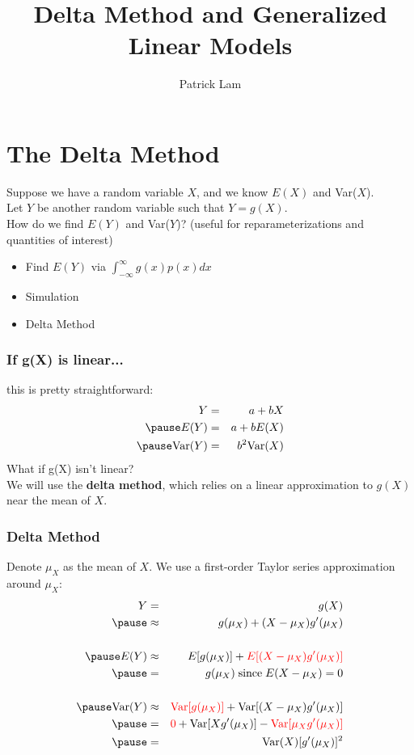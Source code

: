 \documentclass{beamer}
\author{Patrick Lam}
\title{Delta Method and Generalized Linear Models}
\date{}
\begin{document}
\newcommand{\red}{\textcolor{red}}
\newcommand{\blue}{\textcolor{blue}}
\newcommand{\purple}{\textcolor{purple}}
\newcommand{\brown}{\textcolor{brown}}

\frame{\titlepage}

\section{The Delta Method}

\begin{frame}
\pause
Suppose we have a random variable $X$, and we know $E(X)$ and Var($X$).\\
\pause
\bigskip
Let $Y$ be another random variable such that $Y = g(X)$. \\
\pause
\bigskip
How do we find $E(Y)$ and Var($Y$)? \pause (useful for
reparameterizations and quantities of interest) \\
\pause
\begin{itemize}
\item Find $E(Y)$ via $\int_{-\infty}^{\infty} g(x) p(x) dx$
\pause
\item Simulation
\pause
\item Delta Method
\end{itemize}
\end{frame}

\begin{frame}
\frametitle{If g(X) is linear...}
\pause
this is pretty straightforward:
\pause
\begin{eqnarray*}
Y &=& a + bX \\
\pause
E(Y) &=& a + b E(X) \\
\pause
\mathrm{Var}(Y) &=& b^2 \mathrm{Var}(X)
\end{eqnarray*}
\pause
What if g(X) isn't linear? \\
\bigskip
\pause
We will use the \textbf{delta method}, which relies on a linear approximation to $g(X)$ near the mean of $X$.
\end{frame}

\begin{frame}
\frametitle{Delta Method}
\pause
Denote $\mu_X$ as the mean of $X$. \pause We use a first-order
Taylor series approximation around $\mu_X$:
\pause
\begin{eqnarray*}
Y &=& g(X) \\
\pause
&\approx& g(\mu_X) + (X - \mu_X) g'(\mu_X) \\ \\
\pause 
E(Y) &\approx& E[g(\mu_X)] + \red{E[(X - \mu_X) g'(\mu_X)]} \\
\pause
&=& g(\mu_X) \; \mathrm{since \;}E(X-\mu_X) = 0 \\ \\
\pause
\mathrm{Var}(Y) &\approx& \red{\mathrm{Var}[g(\mu_X)]} + \mathrm{Var}[(X -
\mu_X) g'(\mu_X)] \\
\pause
&=& \red{0} + \mathrm{Var}[X g'(\mu_X)] - \red{\mathrm{Var}[\mu_X g'(\mu_X) ]} \\
\pause
&=& \mathrm{Var}(X) [g'(\mu_X)]^2
\end{eqnarray*}

\end{frame}
\end{document}
